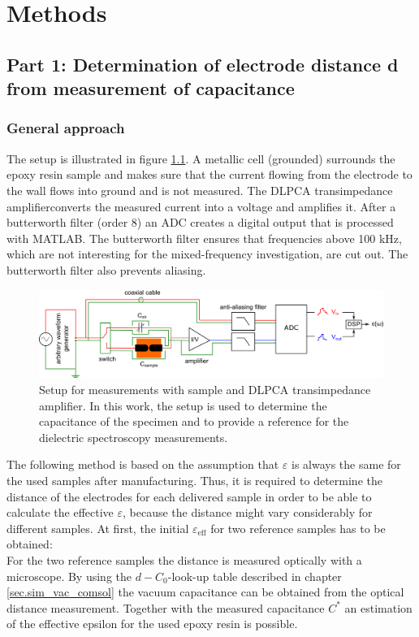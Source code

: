\chapter{Methods}
\section{Part 1: Determination of electrode distance d from measurement of capacitance}
\label{part1}
\subsection{General approach}
The setup is illustrated in figure \ref{sec.setup_amp_1}. A metallic cell (grounded) surrounds the  epoxy resin sample and makes sure that the current flowing from the electrode to the wall flows into ground and is not measured. The DLPCA transimpedance amplifier\footnotemark converts the measured current into a voltage and amplifies it. After a butterworth filter (order 8) an ADC creates a digital output that is processed with MATLAB. The butterworth filter ensures that frequencies above 100 kHz, which are not interesting for the mixed-frequency investigation, are cut out. The butterworth filter also prevents aliasing. 
\begin{figure}[htbp]
	\centering
	\includegraphics[width=\textwidth]{figures/Method/setup/setup_amplifier.png}		
	\caption[Kurze Abbildungsbeschreibung]{Setup for measurements with sample and DLPCA transimpedance amplifier. In this work, the setup is used to determine the capacitance of the specimen and to provide a reference for the dielectric spectroscopy measurements.\protect\footnotemark} 
	\label{sec.setup_amp_1}
\end{figure}

\label{sec:general_approach}
The following method is based on the assumption that  $\varepsilon$ is always the same for the used samples after manufacturing. Thus, it is required to determine the distance of the electrodes for each delivered sample in order to be able to calculate the effective $\varepsilon$, because the distance might vary considerably for different samples. 
At first, the initial $\varepsilon_{\textrm{eff}}$ for two reference samples has to be obtained:\\
For the two reference samples the distance is measured optically with a microscope. By using the $d-C_0$-look-up table described in  chapter \ref{sec.sim_vac_comsol} the vacuum capacitance can be obtained from the optical distance measurement. Together with the measured capacitance $C^*$ an estimation of the effective epsilon for the used epoxy resin is possible. 

